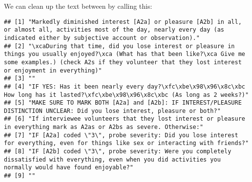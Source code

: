 \documentclass[
]{article}
\newenvironment{Shaded}{\begin{snugshade}}{\end{snugshade}}
\newcommand{\FunctionTok}[1]{\textcolor[rgb]{0.00,0.00,0.00}{#1}}
\newcommand{\NormalTok}[1]{#1}
\newcommand{\OtherTok}[1]{\textcolor[rgb]{0.56,0.35,0.01}{#1}}
\newcommand{\SpecialCharTok}[1]{\textcolor[rgb]{0.00,0.00,0.00}{#1}}
\newcommand{\StringTok}[1]{\textcolor[rgb]{0.31,0.60,0.02}{#1}}
\begin{document}
We can clean up the text between by calling this:

\begin{Shaded}
\end{Shaded}

\begin{verbatim}
## [1] "Markedly diminished interest [A2a] or pleasure [A2b] in all, or almost all, activities most of the day, nearly every day (as indicated either by subjective account or observation)."                                             
## [2] "\xcaDuring that time, did you lose interest or pleasure in things you usually enjoyed?\xca (What has that been like?\xca Give me some examples.) (check A2s if they volunteer that they lost interest or enjoyment in everything)"
## [3] ""                                                                                                                                                                                                                                 
## [4] "IF YES: Has it been nearly every day?\xfc\xbe\x98\x96\x8c\xbc How long has it lasted?\xfc\xbe\x98\x96\x8c\xbc (As long as 2 weeks?)"                                                                                                                          
## [5] "MAKE SURE TO MARK BOTH [A2a] and [A2b]: IF INTEREST/PLEASURE DISTINCTION UNCLEAR: Did you lose interest, pleasure or both?"                                                                                                       
## [6] "If interviewee volunteers that they lost interest or pleasure in everything mark as A2as or A2bs as severe. Otherwise:"                                                                                                           
## [7] "IF [A2a] coded \"3\", probe severity: Did you lose interest for everything, even for things like sex or interacting with friends?"                                                                                                
## [8] "IF [A2b] coded \"3\", probe severity: Were you completely dissatisfied with everything, even when you did activities you normally would have found enjoyable?"                                                                    
## [9] ""
\end{verbatim}
\end{document}
